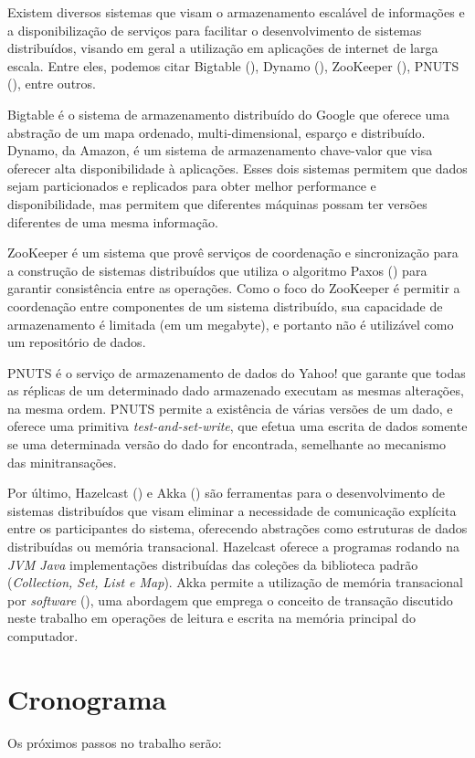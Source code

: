 \documentclass[11pt,twoside,a4paper]{book}
\begin{document}
Existem diversos sistemas que visam o armazenamento escalável de informações e a disponibilização de serviços para facilitar o desenvolvimento de sistemas distribuídos, visando em geral a utilização em aplicações de internet de larga escala. Entre eles, podemos citar Bigtable (\cite{bigtable}), Dynamo (\cite{dynamo}), ZooKeeper (\cite{zookeeper}), PNUTS (\cite{pnuts}), entre outros. 

Bigtable é o sistema de armazenamento distribuído do Google que oferece uma abstração de um mapa ordenado, multi-dimensional, esparço e distribuído. Dynamo, da Amazon, é um sistema de armazenamento chave-valor que visa oferecer alta disponibilidade à aplicações. Esses dois sistemas permitem que dados sejam particionados e replicados para obter melhor performance e disponibilidade, mas permitem que diferentes máquinas possam ter versões diferentes de uma mesma informação. 

ZooKeeper é um sistema que provê serviços de coordenação e sincronização para a construção de sistemas distribuídos que utiliza o algoritmo Paxos (\cite{paxos}) para garantir consistência entre as operações. Como o foco do ZooKeeper é permitir a coordenação entre componentes de um sistema distribuído, sua capacidade de armazenamento é limitada (em um megabyte), e portanto não é utilizável como um repositório de dados.

PNUTS é o serviço de armazenamento de dados do Yahoo! que garante que todas as réplicas de um determinado dado armazenado executam as mesmas alterações, na mesma ordem. PNUTS permite a existência de várias versões de um dado, e oferece uma primitiva \emph{test-and-set-write}, que efetua uma escrita de dados somente se uma determinada versão do dado for encontrada, semelhante ao mecanismo das minitransações.

Por último, Hazelcast (\cite{hazelcast}) e Akka (\cite{akka}) são ferramentas para o desenvolvimento de sistemas distribuídos que visam eliminar a necessidade de comunicação explícita entre os participantes do sistema, oferecendo abstrações como estruturas de dados distribuídas ou memória transacional. Hazelcast oferece a programas rodando na \emph{JVM Java} implementações distribuídas das coleções da biblioteca padrão (\emph{Collection, Set, List e Map}). Akka permite a utilização de memória transacional por \emph{software} (\cite{stm}), uma abordagem que emprega o conceito de transação discutido neste trabalho em operações de leitura e escrita na memória principal do computador.

\chapter{Cronograma}
\label{chap:cronograma}
Os próximos passos no trabalho serão:
\end{document}

